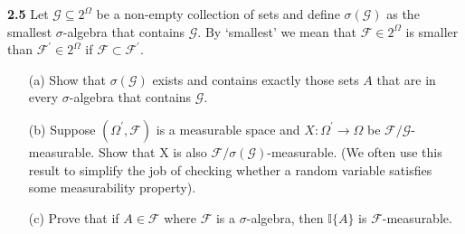 \noindent\textbf{2.5}
Let $\mathcal{G}\subseteq 2^{\Omega}$ be a non-empty collection of sets and define $\sigma(\mathcal{G})$ as the smallest
$\sigma$-algebra that contains $\mathcal{G}$. By `smallest' we mean that $\mathcal{F}\in 2^{\Omega}$ is smaller than
$\mathcal{F}^{\prime}\in 2^{\Omega}$ if $\mathcal{F}\subset \mathcal{F}^{\prime}$.
\begin{enumerate}
    \item[(a)] Show that $\sigma(\mathcal{G})$ exists and contains exactly those sets $A$ that are in every
    $\sigma$-algebra that contains $\mathcal{G}$.
    \item[(b)] Suppose $(\Omega^{\prime},\mathcal{F})$ is a measurable space and $X:\Omega^{\prime}\rightarrow \Omega$ be $\mathcal{F}/\mathcal{G}$-measurable. Show that X is also $\mathcal{F}/\sigma(\mathcal{G})$-measurable. (We often use this result to simplify the job of checking whether a random variable satisfies some measurability property).
    \item[(c)] Prove that if $A\in \mathcal{F}$ where $\mathcal{F}$ is a $\sigma$-algebra, then $\mathbb{I}\{A\}$ is $\mathcal{F}$-measurable.
\end{enumerate}

